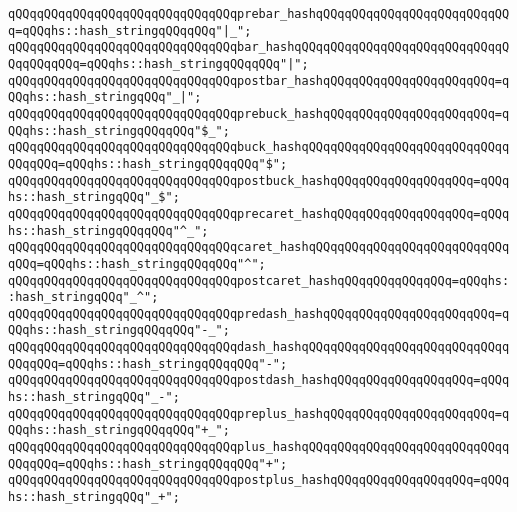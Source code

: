 \newline
\verb|qQQqqQQqqQQqqQQqqQQqqQQqqQQqqQQqprebar_hashqQQqqQQqqQQqqQQqqQQqqQQqqQQq=qQQqhs::hash_stringqQQqqQQq"|\verb#|_";#\newline
\verb|qQQqqQQqqQQqqQQqqQQqqQQqqQQqqQQqbar_hashqQQqqQQqqQQqqQQqqQQqqQQqqQQqqQQqqQQqqQQq=qQQqhs::hash_stringqQQqqQQq"|\verb#|";#\newline
\verb|qQQqqQQqqQQqqQQqqQQqqQQqqQQqqQQqpostbar_hashqQQqqQQqqQQqqQQqqQQqqQQq=qQQqhs::hash_stringqQQq"_|\verb#|";#\newline
\newline
\verb|qQQqqQQqqQQqqQQqqQQqqQQqqQQqqQQqprebuck_hashqQQqqQQqqQQqqQQqqQQqqQQq=qQQqhs::hash_stringqQQqqQQq"$_";|\newline
\verb|qQQqqQQqqQQqqQQqqQQqqQQqqQQqqQQqbuck_hashqQQqqQQqqQQqqQQqqQQqqQQqqQQqqQQqqQQq=qQQqhs::hash_stringqQQqqQQq"$";|\newline
\verb|qQQqqQQqqQQqqQQqqQQqqQQqqQQqqQQqpostbuck_hashqQQqqQQqqQQqqQQqqQQq=qQQqhs::hash_stringqQQq"_$";|\newline
\newline
\verb|qQQqqQQqqQQqqQQqqQQqqQQqqQQqqQQqprecaret_hashqQQqqQQqqQQqqQQqqQQq=qQQqhs::hash_stringqQQqqQQq"^_";|\newline
\verb|qQQqqQQqqQQqqQQqqQQqqQQqqQQqqQQqcaret_hashqQQqqQQqqQQqqQQqqQQqqQQqqQQqqQQq=qQQqhs::hash_stringqQQqqQQq"^";|\newline
\verb|qQQqqQQqqQQqqQQqqQQqqQQqqQQqqQQqpostcaret_hashqQQqqQQqqQQqqQQq=qQQqhs::hash_stringqQQq"_^";|\newline
\newline
\verb|qQQqqQQqqQQqqQQqqQQqqQQqqQQqqQQqpredash_hashqQQqqQQqqQQqqQQqqQQqqQQq=qQQqhs::hash_stringqQQqqQQq"-_";|\newline
\verb|qQQqqQQqqQQqqQQqqQQqqQQqqQQqqQQqdash_hashqQQqqQQqqQQqqQQqqQQqqQQqqQQqqQQqqQQq=qQQqhs::hash_stringqQQqqQQq"-";|\newline
\verb|qQQqqQQqqQQqqQQqqQQqqQQqqQQqqQQqpostdash_hashqQQqqQQqqQQqqQQqqQQq=qQQqhs::hash_stringqQQq"_-";|\newline
\newline
\verb|qQQqqQQqqQQqqQQqqQQqqQQqqQQqqQQqpreplus_hashqQQqqQQqqQQqqQQqqQQqqQQq=qQQqhs::hash_stringqQQqqQQq"+_";|\newline
\verb|qQQqqQQqqQQqqQQqqQQqqQQqqQQqqQQqplus_hashqQQqqQQqqQQqqQQqqQQqqQQqqQQqqQQqqQQq=qQQqhs::hash_stringqQQqqQQq"+";|\newline
\verb|qQQqqQQqqQQqqQQqqQQqqQQqqQQqqQQqpostplus_hashqQQqqQQqqQQqqQQqqQQq=qQQqhs::hash_stringqQQq"_+";|\newline
